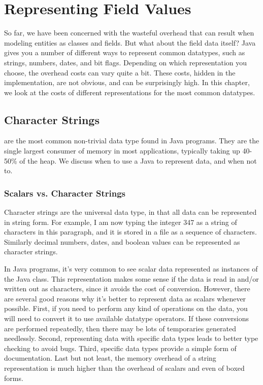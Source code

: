 \chapter{Representing Field Values}
\label{chapter:representing-values}

So far, we have been concerned with the wasteful overhead that can result when
modeling entities as classes and fields. But what about the field data
itself? Java gives you a number of different ways to represent common datatypes, such
as strings, numbers, dates, and bit flags. Depending on which
representation you choose, the overhead costs can vary quite a bit. 
These costs, hidden in the implementation, are not obvious, and can be
surprisingly high.
In this chapter, we look at the costs of different representations for the most 
common datatypes.

\section{Character Strings}
 are the most common non-trivial data type found in Java
programs. They are the single largest consumer of memory in most applications,
typically taking up 40-50\% of the heap. We discuss when to use a Java  to
represent data, and when not to.

\subsection{Scalars vs. Character Strings}
Character strings are the universal data type, in that all data can be
represented in string form.  For example, I am now typing the integer 347 as a
string of characters in this paragraph, and it is stored in a file as a sequence
of characters. Similarly decimal numbers, dates, and boolean values can be
represented as character strings.
 
In Java programs, it's very common to see scalar data represented as instances
of the Java  class. This representation makes some sense if the
data is read in and/or written out as characters, since it avoids the
cost of conversion. However, there are several good reasons why it's better
to represent data as scalars whenever possible. First, if you need to perform
any kind of operations on the data, you will need to convert it to use
available datatype operators. If these conversions are performed
repeatedly, then there may be lots of temporaries generated needlessly.  Second,
representing data with specific data types leads to better type checking to avoid bugs. 
Third, specific data types provide a simple form of documentation.
Last but not least, the memory overhead of a string representation is much
higher than the overhead of scalars and even of boxed forms.

